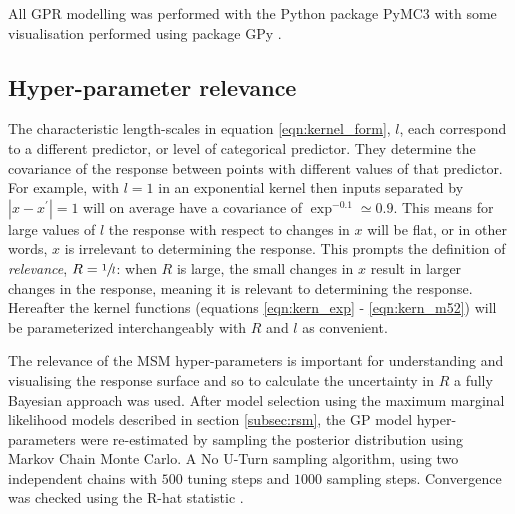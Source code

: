 All GPR modelling was performed with the Python package PyMC3 \cite{salvatierProbabilisticProgrammingPython2016} with some visualisation performed using package GPy \cite{gpy2014}. 

\subsection{Hyper-parameter relevance}\label{subsec:meth_rel}
The characteristic length-scales in equation \ref{eqn:kernel_form}, $l$, each correspond to a different predictor, or level of categorical predictor. They determine the covariance of the response between points with different values of that predictor. For example, with $l=1$ in an exponential kernel then inputs separated by $|x-x^{\prime}|= 1$ will on average have a covariance of $\exp^{-0.1}\simeq 0.9$. This means for large values of $l$ the response with respect to changes in $x$ will be flat, or in other words, $x$ is irrelevant to determining the response. This prompts the definition of \emph{relevance}, $R = \sfrac{1}{l}$: when $R$ is large, the small changes in $x$ result in larger changes in the response, meaning it is relevant to determining the response. Hereafter the kernel functions (equations \ref{eqn:kern_exp} - \ref{eqn:kern_m52}) will be parameterized interchangeably with $R$ and $l$ as convenient.  

The relevance of the MSM hyper-parameters is important for understanding and visualising the response surface and so to calculate the uncertainty in $R$ a fully Bayesian approach was used. After model selection using the maximum marginal likelihood models described in section \ref{subsec:rsm}, the GP model hyper-parameters were re-estimated by sampling the posterior distribution using Markov Chain Monte Carlo. A No U-Turn sampling algorithm, using two independent chains with $500$ tuning steps and $1000$ sampling steps. Convergence was checked using the R-hat statistic \cite{gelmanBayesianDataAnalysis2014}. 



